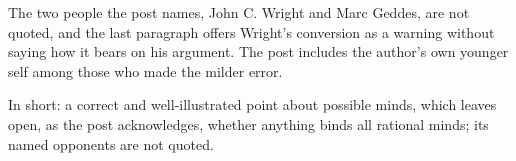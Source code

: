 \begin{afterword}
The two people the post names, John C. Wright and Marc Geddes, are not quoted, and the last paragraph offers Wright's conversion as a warning without saying how it bears on his argument. The post includes the author's own younger self among those who made the milder error.

In short: a correct and well-illustrated point about possible minds, which leaves open, as the post acknowledges, whether anything binds all rational minds; its named opponents are not quoted.
\end{afterword}
